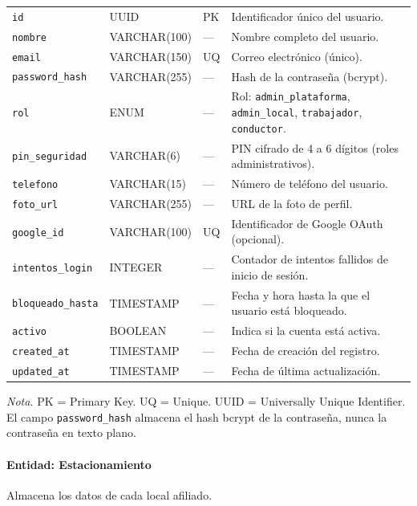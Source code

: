 \begin{longtable}{p{3.5cm} p{2.5cm} p{1.5cm} p{6.5cm}}
\texttt{id} & UUID & PK & Identificador único del usuario. \\
\texttt{nombre} & VARCHAR(100) & --- & Nombre completo del usuario. \\
\texttt{email} & VARCHAR(150) & UQ & Correo electrónico (único). \\
\texttt{password\_hash} & VARCHAR(255) & --- & Hash de la contraseña (bcrypt). \\
\texttt{rol} & ENUM & --- & Rol: \texttt{admin\_plataforma}, \texttt{admin\_local}, \texttt{trabajador}, \texttt{conductor}. \\
\texttt{pin\_seguridad} & VARCHAR(6) & --- & PIN cifrado de 4 a 6 dígitos (roles administrativos). \\
\texttt{telefono} & VARCHAR(15) & --- & Número de teléfono del usuario. \\
\texttt{foto\_url} & VARCHAR(255) & --- & URL de la foto de perfil. \\
\texttt{google\_id} & VARCHAR(100) & UQ & Identificador de Google OAuth (opcional). \\
\texttt{intentos\_login} & INTEGER & --- & Contador de intentos fallidos de inicio de sesión. \\
\texttt{bloqueado\_hasta} & TIMESTAMP & --- & Fecha y hora hasta la que el usuario está bloqueado. \\
\texttt{activo} & BOOLEAN & --- & Indica si la cuenta está activa. \\
\texttt{created\_at} & TIMESTAMP & --- & Fecha de creación del registro. \\
\texttt{updated\_at} & TIMESTAMP & --- & Fecha de última actualización. \\
\end{longtable}

\textit{Nota.} PK = Primary Key. UQ = Unique. UUID = Universally Unique Identifier. El campo \texttt{password\_hash} almacena el hash bcrypt de la contraseña, nunca la contraseña en texto plano.

\paragraph{Entidad: Estacionamiento} Almacena los datos de cada local afiliado.

